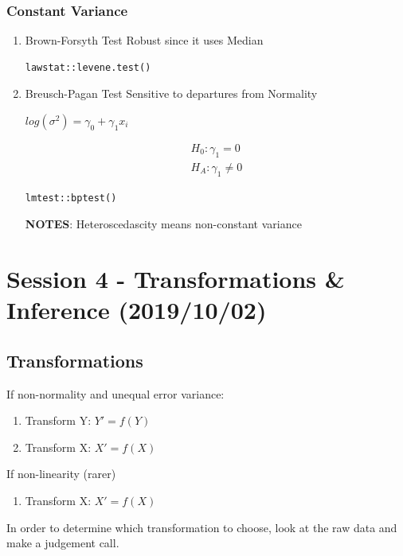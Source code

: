 \documentclass[11pt]{article}
\begin{document}
\subsubsection{Constant Variance}
\label{sec:orgf7e3d32}
\begin{enumerate}
\item Brown-Forsyth Test
\label{sec:orge67109f}
Robust since it uses Median
\begin{verbatim}
lawstat::levene.test()
\end{verbatim}
\item Breusch-Pagan Test
\label{sec:orgd37fad9}
Sensitive to departures from Normality

\(log(\sigma^2) = \gamma_0 + \gamma_1 x_i\)

\begin{equation}
\begin{split}
H_0: \gamma_1 = 0\\
H_A: \gamma_1 \neq 0
\end{split}
\end{equation}

\begin{verbatim}
lmtest::bptest()
\end{verbatim}

\textbf{NOTES}: Heteroscedascity means non-constant variance
\end{enumerate}
\section{Session 4 - Transformations \& Inference (2019/10/02)}
\label{sec:orga1eb719}
\subsection{Transformations}
\label{sec:orgd2b66ef}
If non-normality and unequal error variance:
\begin{enumerate}
\item Transform Y: \(Y' = f(Y)\)
\item Transform X: \(X' = f(X)\)
\end{enumerate}

If non-linearity (rarer)
\begin{enumerate}
\item Transform X: \(X' = f(X)\)
\end{enumerate}

In order to determine which transformation to choose, look at the raw data and
make a judgement call.
\end{document}

